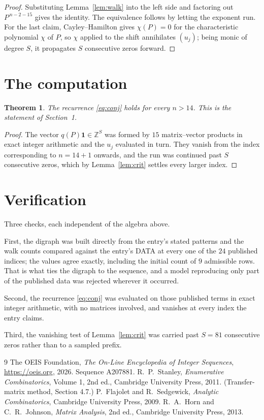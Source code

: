 \documentclass[11pt,a4paper]{article}
\theoremstyle{plain}
\newtheorem{theorem}{Theorem}
\theoremstyle{definition}
\begin{document}
\begin{proof}
Substituting Lemma~\ref{lem:walk} into the left side and factoring out
$P^{\,n-2-15}$ gives the identity. The equivalence follows by letting the exponent
run. For the last claim, Cayley--Hamilton gives $\chi(P)=0$ for the characteristic
polynomial $\chi$ of $P$, so $\chi$ applied to the shift annihilates $(u_j)$; being monic of
degree $S$, it propagates $S$ consecutive zeros forward.
\end{proof}

\section{The computation}

\begin{theorem}
The recurrence \eqref{eq:conj} holds for every $n>14$. This is the statement of
Section~1.
\end{theorem}

\begin{proof}
The vector $q(P)\mathbf{1}\in\mathbb{Z}^{S}$ was formed by $15$ matrix--vector
products in exact integer arithmetic and the $u_j$ evaluated in turn. They vanish from the
index corresponding to $n=14+1$ onwards, and the run was continued past $S$ consecutive
zeros, which by Lemma~\ref{lem:crit} settles every larger index.
\end{proof}

\section{Verification}

Three checks, each independent of the algebra above.

First, the digraph was built directly from the entry's stated patterns and the walk counts
compared against the entry's DATA at every one of the $24$ published indices; the
values agree exactly, including the initial count of $9$ admissible rows. That is
what ties the digraph to the sequence, and a model reproducing only part of the published
data was rejected wherever it occurred.

Second, the recurrence \eqref{eq:conj} was evaluated on those published terms in exact
integer arithmetic, with no matrices involved, and vanishes at every index the entry claims.

Third, the vanishing test of Lemma~\ref{lem:crit} was carried past $S=81$ consecutive
zeros rather than to a sampled prefix.

\begin{thebibliography}{9}
 The OEIS Foundation, \emph{The On-Line Encyclopedia of Integer
Sequences}, \url{https://oeis.org}, 2026. Sequence A207881.
 R.~P.~Stanley, \emph{Enumerative Combinatorics}, Volume 1, 2nd ed.,
Cambridge University Press, 2011. (Transfer-matrix method, Section 4.7.)
 P.~Flajolet and R.~Sedgewick, \emph{Analytic Combinatorics}, Cambridge
University Press, 2009.
 R.~A.~Horn and C.~R.~Johnson, \emph{Matrix Analysis}, 2nd ed., Cambridge
University Press, 2013.
\end{thebibliography}
\end{document}

